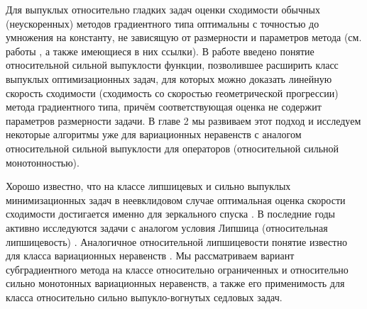 Для выпуклых относительно гладких задач оценки сходимости обычных (неускоренных) методов градиентного типа оптимальны с точностью до умножения на константу, не зависящую от размерности и параметров метода (см. работы \cite{Bauschke,Drag,Dragomir,Lu_Nesterov_2018}, а также имеющиеся в них ссылки). В работе \cite{Lu_Nesterov_2018} введено понятие относительной сильной выпуклости функции, позволившее расширить класс выпуклых оптимизационных задач, для которых можно доказать линейную скорость сходимости (сходимость со скоростью геометрической прогрессии) метода градиентного типа, причём соответствующая оценка не содержит параметров размерности задачи. В главе 2 мы развиваем этот подход и исследуем некоторые алгоритмы уже для вариационных неравенств с аналогом относительной сильной выпуклости для операторов (относительной сильной монотонностью).

Хорошо известно, что на классе липшицевых и сильно выпуклых минимизационных задач в неевклидовом случае оптимальная оценка скорости сходимости достигается именно для зеркального спуска \cite{Bach_2012}. В последние годы активно исследуются задачи с аналогом условия Липшица (относительная липшицевость) \cite{AdaMirr_2021,Lu_2018,Zhou_NIPS_2020}. Аналогичное относительной липшицевости понятие известно для класса вариационных неравенств \cite{Main}. Мы рассматриваем вариант субградиентного метода на классе относительно ограниченных и относительно сильно монотонных вариационных неравенств, а также его применимость для класса относительно сильно выпукло-вогнутых седловых задач. 

